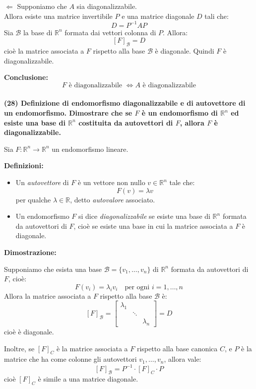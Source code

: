\documentclass[10pt]{extarticle}
\begin{document}
\vspace{0.2cm}
\noindent
\underline{\( \Leftarrow \)} Supponiamo che \( A \) sia diagonalizzabile. \\
Allora esiste una matrice invertibile \( P \) e una matrice diagonale \( D \) tali che:
\[
D = P^{-1} A P
\]
Sia \( \mathcal{B} \) la base di \( \mathbb{R}^n \) formata dai vettori colonna di \( P \). Allora:
\[
[F]_{\mathcal{B}} = D
\]
cioè la matrice associata a \( F \) rispetto alla base \( \mathcal{B} \) è diagonale. Quindi \( F \) è diagonalizzabile.

\textbf{Conclusione:}
\[
F \text{ è diagonalizzabile } \iff A \text{ è diagonalizzabile}
\]
\vspace{1em}\\
\textbf{(28) Definizione di endomorfismo diagonalizzabile e di autovettore di un endomorfismo. Dimostrare che se \( F \) è un endomorfismo di \( \mathbb{R}^n \) ed esiste una base di \( \mathbb{R}^n \) costituita da autovettori di \( F \), allora \( F \) è diagonalizzabile.}

Sia \( F : \mathbb{R}^n \to \mathbb{R}^n \) un endomorfismo lineare.

\textbf{Definizioni:}
\begin{itemize}
    \item Un \emph{autovettore} di \( F \) è un vettore non nullo \( v \in \mathbb{R}^n \) tale che:
    \[
    F(v) = \lambda v
    \]
    per qualche \( \lambda \in \mathbb{R} \), detto \emph{autovalore} associato.

    \item Un endomorfismo \( F \) si dice \emph{diagonalizzabile} se esiste una base di \( \mathbb{R}^n \) formata da autovettori di \( F \), cioè se esiste una base in cui la matrice associata a \( F \) è diagonale.
\end{itemize}

\textbf{Dimostrazione:}

Supponiamo che esista una base \( \mathcal{B} = \{v_1, \dots, v_n\} \) di \( \mathbb{R}^n \) formata da autovettori di \( F \), cioè:
\[
F(v_i) = \lambda_i v_i \quad \text{per ogni } i = 1, \dots, n
\]
Allora la matrice associata a \( F \) rispetto alla base \( \mathcal{B} \) è:
\[
[F]_{\mathcal{B}} = \begin{bmatrix}
\lambda_1 & & \\
& \ddots & \\
& & \lambda_n
\end{bmatrix}
= D
\]
cioè è diagonale.

Inoltre, se \([F]_{C} \) è la matrice associata a \( F \) rispetto alla base canonica \( C \), e \( P \) è la matrice che ha come colonne gli autovettori \( v_1, \dots, v_n \), allora vale:
\[
[F]_{\mathcal{B}} = P^{-1} \cdot [F]_{C} \cdot P
\]
cioè \( [F]_{C} \) è simile a una matrice diagonale.
\end{document}
